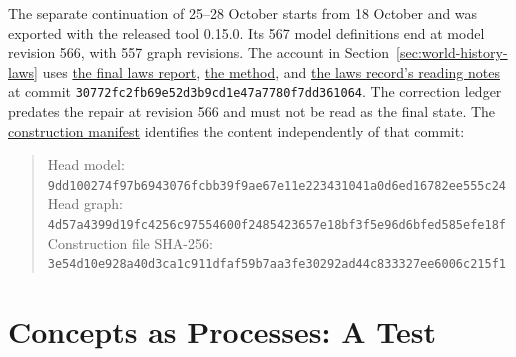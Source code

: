\documentclass[11pt,a4paper]{article}
\begin{document}
The separate continuation of 25--28 October starts from 18 October and was
exported with the released tool 0.15.0. Its 567 model definitions end at model
revision 566, with 557 graph revisions. The account in
Section~\ref{sec:world-history-laws} uses
\href{https://github.com/emergent-wisdom/world-history/blob/30772fc2fb69e52d3b9cd1e47a7780f7dd361064/laws/report.md}{the final laws report},
\href{https://github.com/emergent-wisdom/world-history/blob/30772fc2fb69e52d3b9cd1e47a7780f7dd361064/METHOD.md}{the method}, and
\href{https://github.com/emergent-wisdom/world-history/blob/30772fc2fb69e52d3b9cd1e47a7780f7dd361064/laws/README.md}{the laws record's reading notes}
at commit \texttt{30772fc2fb69e52d3b9cd1e47a7780f7dd361064}.
The correction ledger predates the repair at revision 566 and must not be read
as the final state. The
\href{https://github.com/emergent-wisdom/world-history/blob/30772fc2fb69e52d3b9cd1e47a7780f7dd361064/construction/MANIFEST.json}{construction manifest}
identifies the content independently of that commit:
\begin{quote}
\small
Head model:\\
\nolinkurl{9dd100274f97b6943076fcbb39f9ae67e11e223431041a0d6ed16782ee555c24}\\
Head graph:\\
\nolinkurl{4d57a4399d19fc4256c97554600f2485423657e18bf3f5e96d6bfed585efe18f}\\
Construction file SHA-256:\\
\nolinkurl{3e54d10e928a40d3ca1c911dfaf59b7aa3fe30292ad44c833327ee6006c215f1}
\end{quote}

\section{Concepts as Processes: A Test}
\label{app:concepts-as-processes}
\end{document}
